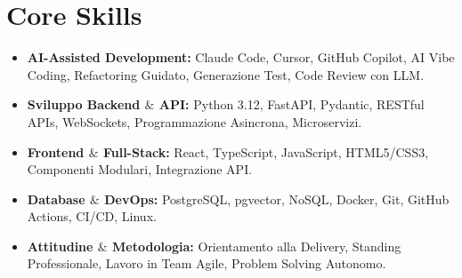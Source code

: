 \documentclass[a4paper,10pt]{article}
\begin{document}
\section{Core Skills}
\begin{itemize}
  \item \textbf{AI-Assisted Development:} Claude Code, Cursor, GitHub Copilot, AI Vibe Coding, Refactoring Guidato, Generazione Test, Code Review con LLM.
  \item \textbf{Sviluppo Backend $\&$ API:} Python 3.12, FastAPI, Pydantic, RESTful APIs, WebSockets, Programmazione Asincrona, Microservizi.
  \item \textbf{Frontend $\&$ Full-Stack:} React, TypeScript, JavaScript, HTML5/CSS3, Componenti Modulari, Integrazione API.
  \item \textbf{Database $\&$ DevOps:} PostgreSQL, pgvector, NoSQL, Docker, Git, GitHub Actions, CI/CD, Linux.
  \item \textbf{Attitudine $\&$ Metodologia:} Orientamento alla Delivery, Standing Professionale, Lavoro in Team Agile, Problem Solving Autonomo.
\end{itemize}
\end{document}
